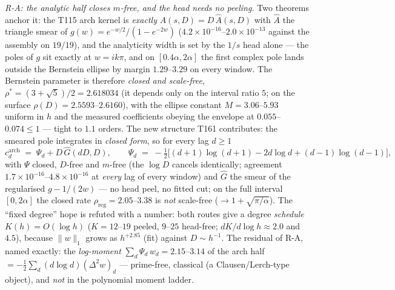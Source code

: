 \documentclass[11pt,a4paper]{article}
\begin{document}
\emph{R-A: the analytic half closes $m$-free, and the head needs no peeling.}
Two theorems anchor it: the T115 arch kernel is \emph{exactly}
$A(s,D)=D\,\widehat A(s,D)$ with $\widehat A$ the triangle smear of
$g(w)=e^{-w/2}/(1-e^{-2w})$ ($4.2\times10^{-16}$--$2.0\times10^{-13}$ against the
assembly on $19/19$), and the analyticity width is set by the $1/s$ head alone ---
the poles of $g$ sit exactly at $w=ik\pi$, and on $[0.4\alpha,2\alpha]$ the first
complex pole lands outside the Bernstein ellipse by margin $1.29$--$3.29$ on every
window. The Bernstein parameter is therefore \emph{closed and scale-free},
$\rho^*=(3+\sqrt5)/2=2.618034$ (it depends only on the interval ratio $5$; on the
surface $\rho(D)=2.5593$--$2.6160$), with the ellipse constant $M=3.06$--$5.93$
uniform in $h$ and the measured coefficients obeying the envelope at
$0.055$--$0.074\le1$ --- tight to $1.1$ orders. The new structure T161 contributes:
the smeared pole integrates in \emph{closed form}, so for every lag $d\ge1$
\[
c^{\mathrm{arch}}_d\;=\;\Psi_d+D\,\widehat G(dD,D),\qquad
\Psi_d\;=\;-\tfrac12\bigl[(d{+}1)\log(d{+}1)-2d\log d+(d{-}1)\log(d{-}1)\bigr],
\]
with $\Psi$ closed, $D$-free and $m$-free (the $\log D$ cancels identically;
agreement $1.7\times10^{-16}$--$4.8\times10^{-16}$ at \emph{every} lag of every
window) and $\widehat G$ the smear of the regularised $g-1/(2w)$ --- no head peel,
no fitted cut; on the full interval $[0,2\alpha]$ the closed rate
$\rho_{\mathrm{reg}}=2.05$--$3.38$ is \emph{not} scale-free
($\to1+\sqrt{\pi/\alpha}$). The ``fixed degree'' hope is refuted with a number:
both routes give a degree \emph{schedule} $K(h)=O(\log h)$ ($K=12$--$19$ peeled,
$9$--$25$ head-free; $dK/d\log h\approx2.0$ and $4.5$), because $\|w\|_1$ grows as
$h^{+2.85}$ (fit) against $D\sim h^{-1}$. The residual of R-A, named exactly: the
\emph{log-moment} $\sum_d\Psi_d\,w_d=2.15$--$3.14$ of the arch half
$=-\tfrac12\sum_d(d\log d)(\Delta^2w)_d$ --- prime-free, classical (a
Clausen/Lerch-type object), and \emph{not} in the polynomial moment ladder.
\end{document}
